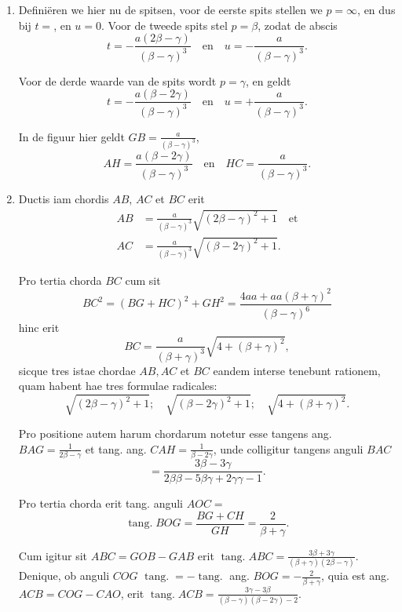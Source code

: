 \documentclass[10pt,a4paper]{article}
\newcommand{\switchenum}{\setcounter{enumi}{\arabic{enumi}-1}\switchcolumn}
\DeclareMathOperator{\tang}{tang.}
\begin{document}
\begin{paracol}{2}
\begin{enumerate}[topsep=1px]
		\switchenum
		\item Definiëren we hier nu de spitsen, voor de eerste spits stellen we $p=\infty$, en dus bij $t=$, en $u=0$. Voor de tweede spits stel $p=\beta$, zodat de abscis
		\[
			t = -\frac{a(2\beta- \gamma)}{(\beta - \gamma)^3} \quad \text{en} \quad u = - \frac{a}{(\beta-\gamma)^3}.
		\]
		\par Voor de derde waarde van de spits wordt $p=\gamma$, en geldt 
		\[
			t = -\frac{a(\beta - 2\gamma)}{(\beta-\gamma)^3} \quad \text{en}\quad u = +\frac{a}{(\beta-\gamma)^3}.
		\]
		\par In de figuur hier geldt $GB = \frac{a}{(\beta - \gamma)^3}$,
		\[
			AH = \frac{a(\beta - 2\gamma)}{(\beta - \gamma)^3} \quad \text{en}\quad HC = \frac{a}{(\beta - \gamma)^3}.
		\]
		
		\switchcolumn*
		
		\item Ductis iam chordis $AB$, $AC$ et $BC$ erit 
		\begin{align*}
			AB &= \frac{a}{(\beta-\gamma)^3}\sqrt{(2\beta-\gamma)^2 +1} \quad \text{et}\\
			AC & = \frac{a}{(\beta-\gamma)^3}\sqrt{(\beta - 2\gamma)^2+1}.
		\end{align*}
		\par Pro tertia chorda $BC$ cum sit
		\[
			BC^2 = (BG + HC)^2 + GH^2 = \frac{4aa+aa(\beta+ \gamma)^2}{(\beta - \gamma )^6}
		\]
		hinc erit
		\[
			BC = \frac{a}{(\beta+\gamma)^3} \sqrt{4+(\beta+\gamma)^2},
		\]
		sicque tres istae chordae $AB, AC$ et $BC$ eandem interse tenebunt rationem, quam habent hae tres formulae radicales:
		\[
			\sqrt{(2\beta-\gamma)^2+1}; \quad \sqrt{(\beta-2\gamma)^2+1}; \quad \sqrt{4+(\beta+\gamma)^2}.
		\]
		\par Pro positione autem harum chordarum notetur esse tangens ang. $BAG = \frac{1}{2\beta- \gamma}$ et tang. ang. $CAH = \frac{1}{\beta - 2\gamma}$, unde colligitur tangens anguli $BAC$
		\[
			= \frac{3\beta - 3\gamma}{2\beta \beta - 5\beta \gamma + 2\gamma \gamma -1}.
		\]
		\par Pro tertia chorda erit tang. anguli $AOC=$
		\[
			\tang BOG = \frac{BG + CH}{GH} = \frac{2}{\beta + \gamma}.
		\] 
		\par Cum igitur sit $ABC = GOB - GAB$ erit $\tang ABC = \frac{3\beta + 3\gamma}{(\beta+\gamma)(2\beta - \gamma)}$. Denique, ob anguli $COG$ $\tang = -\tang$ ang. $BOG = -\frac{2}{\beta+\gamma}$, quia est ang. $ACB = COG-CAO$, erit $\tang ACB = \frac{3\gamma-3\beta}{(\beta - \gamma)(\beta - 2\gamma)-2}$.
		

\end{enumerate}
\end{paracol}
\end{document}
